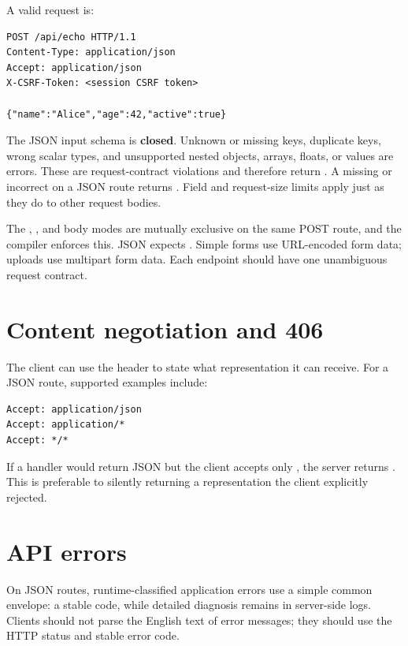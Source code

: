 A valid request is:

\begin{lstlisting}
POST /api/echo HTTP/1.1
Content-Type: application/json
Accept: application/json
X-CSRF-Token: <session CSRF token>

{"name":"Alice","age":42,"active":true}
\end{lstlisting}

The JSON input schema is \textbf{closed}. Unknown or missing keys, duplicate keys, wrong scalar types, and unsupported nested objects, arrays, floats, or  values are errors. These are request-contract violations and therefore return . A missing or incorrect  on a JSON route returns . Field and request-size limits apply just as they do to other request bodies.

The , , and  body modes are mutually exclusive on the same POST route, and the compiler enforces this. JSON expects . Simple forms use URL-encoded form data; uploads use multipart form data. Each endpoint should have one unambiguous request contract.

\section{Content negotiation and 406}

The client can use the  header to state what representation it can receive. For a JSON route, supported examples include:

\begin{lstlisting}
Accept: application/json
Accept: application/*
Accept: */*
\end{lstlisting}

If a handler would return JSON but the client accepts only , the server returns . This is preferable to silently returning a representation the client explicitly rejected.

\section{API errors}

On JSON routes, runtime-classified application errors use a simple common envelope: a stable  code, while detailed diagnosis remains in server-side logs. Clients should not parse the English text of error messages; they should use the HTTP status and stable error code.

